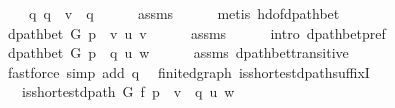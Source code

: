 \begin{isabellebody}
\ \ \ \ q{\isacharprime}{\kern0pt}{\isacharcolon}{\kern0pt}\ {\isachardoublequoteopen}q{\isacharprime}{\kern0pt}\ {\isacharequal}{\kern0pt}\ v\ {\isacharhash}{\kern0pt}\ q{\isacharprime}{\kern0pt}{\isacharprime}{\kern0pt}{\isachardoublequoteclose}\isanewline
\ \ \ \ \isamarkupfalse%
\ assms{\isacharparenleft}{\kern0pt}{}{\isacharparenright}{\kern0pt}\isanewline
\ \ \ \ \isamarkupfalse%
\ {\isacharparenleft}{\kern0pt}metis\ hd{\isacharunderscore}{\kern0pt}of{\isacharunderscore}{\kern0pt}dpath{\isacharunderscore}{\kern0pt}bet{\isacharparenright}{\kern0pt}\isanewline
\ \ \isamarkupfalse%
\ {\isachardoublequoteopen}dpath{\isacharunderscore}{\kern0pt}bet\ G\ {\isacharparenleft}{\kern0pt}p\ {\isacharat}{\kern0pt}\ {\isacharbrackleft}{\kern0pt}v{\isacharbrackright}{\kern0pt}{\isacharparenright}{\kern0pt}\ u\ v{\isachardoublequoteclose}\isanewline
\ \ \ \ \isamarkupfalse%
\ assms{\isacharparenleft}{\kern0pt}{}{\isacharparenright}{\kern0pt}\isanewline
\ \ \ \ \isamarkupfalse%
\ {\isacharparenleft}{\kern0pt}intro\ dpath{\isacharunderscore}{\kern0pt}bet{\isacharunderscore}{\kern0pt}pref{\isacharparenright}{\kern0pt}\isanewline
\ \ \isamarkupfalse%
\ {\isachardoublequoteopen}dpath{\isacharunderscore}{\kern0pt}bet\ G\ {\isacharparenleft}{\kern0pt}p\ {\isacharat}{\kern0pt}\ q{\isacharprime}{\kern0pt}{\isacharparenright}{\kern0pt}\ u\ w{\isachardoublequoteclose}\isanewline
\ \ \ \ \isamarkupfalse%
\ assms{\isacharparenleft}{\kern0pt}{}{\isacharparenright}{\kern0pt}\ dpath{\isacharunderscore}{\kern0pt}bet{\isacharunderscore}{\kern0pt}transitive\isanewline
\ \ \ \ \isamarkupfalse%
\ {\isacharparenleft}{\kern0pt}fastforce\ simp\ add{\isacharcolon}{\kern0pt}\ q{\isacharprime}{\kern0pt}{\isacharparenright}{\kern0pt}\isanewline
{}\isamarkupfalse%
%
\endisatagproof
{\isafoldproof}%
%
\isadelimproof
\isanewline
%
\endisadelimproof
%
\isadeliminvisible
\isanewline
%
\endisadeliminvisible
%
\isataginvisible
{}\isamarkupfalse%
\ {\isacharparenleft}{\kern0pt}\ finite{\isacharunderscore}{\kern0pt}dgraph{\isacharparenright}{\kern0pt}\ is{\isacharunderscore}{\kern0pt}shortest{\isacharunderscore}{\kern0pt}dpath{\isacharunderscore}{\kern0pt}suffixI{\isacharcolon}{\kern0pt}\isanewline
\ \ \ {\isachardoublequoteopen}is{\isacharunderscore}{\kern0pt}shortest{\isacharunderscore}{\kern0pt}dpath\ G\ f\ {\isacharparenleft}{\kern0pt}p\ {\isacharat}{\kern0pt}\ {\isacharbrackleft}{\kern0pt}v{\isacharbrackright}{\kern0pt}\ {\isacharat}{\kern0pt}\ q{\isacharparenright}{\kern0pt}\ u\ w{\isachardoublequoteclose}\isanewline

\end{isabellebody}
